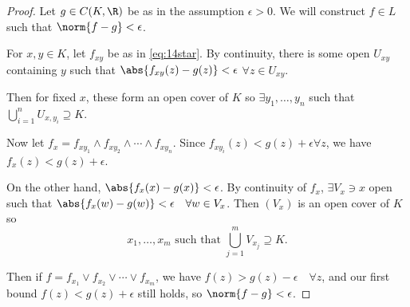 \documentclass{article}
\begin{document}
\begin{proof}
    Let $g \in C(K, \R)$ be as in the assumption $\epsilon > 0$.
    We will construct $f \in L$ such that $\norm{f-g} < \epsilon$.

    For $x, y \in K$, let $f_{xy}$ be as in \eqref{eq:14star}.
    By continuity, there is some open $U_{xy}$ containing $y$ such that $\abs{f_{xy}(z) - g(z)} < \epsilon$ $\forall z \in U_{xy}$.

    Then for fixed $x$, these form an open cover of $K$ so $\exists y_1, \dotsc, y_n$ such that $\bigcup_{i=1}^n U_{x, y_i} \supseteq K$.

    Now let $f_x = f_{xy_1} \wedge f_{xy_2} \wedge \dotsb \wedge f_{xy_n}$.
    Since $f_{xy_i}(z) < g(z) + \epsilon \forall z$, we have $f_x(z) < g(z) + \epsilon$.

    On the other hand, $\abs{f_x(x) - g(x)} < \epsilon$.
    By continuity of $f_x$, $\exists V_x \ni x$ open such that $\abs{f_x(w) - g(w)} < \epsilon \quad \forall w \in V_x$.
    Then $(V_x)$ is an open cover of $K$ so
    \begin{equation*}
        x_1, \dotsc, x_m \text{ such that } \bigcup_{j=1}^m V_{x_j} \supseteq K.
    \end{equation*}

    Then if $f = f_{x_1} \vee f_{x_2} \vee \dotsb \vee f_{x_m}$, we have $f(z) > g(z) - \epsilon \quad \forall z$, and our first bound $f(z) < g(z) + \epsilon$ still holds, so $\norm{f - g} < \epsilon$. %
\end{proof}
\end{document}
